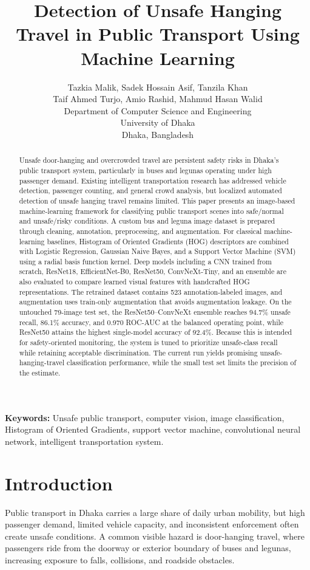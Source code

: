 \documentclass{article}
\title{Detection of Unsafe Hanging Travel in Public Transport Using Machine Learning}
\author{Tazkia Malik, Sadek Hossain Asif, Tanzila Khan\\
Taif Ahmed Turjo, Amio Rashid, Mahmud Hasan Walid\\
Department of Computer Science and Engineering\\
University of Dhaka\\
Dhaka, Bangladesh}
\date{}
\begin{document}
\maketitle

\begin{abstract}
Unsafe door-hanging and overcrowded travel are persistent safety risks in Dhaka's public transport system, particularly in buses and legunas operating under high passenger demand. Existing intelligent transportation research has addressed vehicle detection, passenger counting, and general crowd analysis, but localized automated detection of unsafe hanging travel remains limited. This paper presents an image-based machine-learning framework for classifying public transport scenes into safe/normal and unsafe/risky conditions. A custom bus and leguna image dataset is prepared through cleaning, annotation, preprocessing, and augmentation. For classical machine-learning baselines, Histogram of Oriented Gradients (HOG) descriptors are combined with Logistic Regression, Gaussian Naive Bayes, and a Support Vector Machine (SVM) using a radial basis function kernel. Deep models including a CNN trained from scratch, ResNet18, EfficientNet-B0, ResNet50, ConvNeXt-Tiny, and an ensemble are also evaluated to compare learned visual features with handcrafted HOG representations. The retrained dataset contains 523 annotation-labeled images, and augmentation uses train-only augmentation that avoids augmentation leakage. On the untouched 79-image test set, the ResNet50--ConvNeXt ensemble reaches 94.7\% unsafe recall, 86.1\% accuracy, and 0.970 ROC-AUC at the balanced operating point, while ResNet50 attains the highest single-model accuracy of 92.4\%. Because this is intended for safety-oriented monitoring, the system is tuned to prioritize unsafe-class recall while retaining acceptable discrimination. The current run yields promising unsafe-hanging-travel classification performance, while the small test set limits the precision of the estimate.
\end{abstract}

\noindent\textbf{Keywords:}
Unsafe public transport, computer vision, image classification, Histogram of Oriented Gradients, support vector machine, convolutional neural network, intelligent transportation system.

\section{Introduction}
Public transport in Dhaka carries a large share of daily urban mobility, but high passenger demand, limited vehicle capacity, and inconsistent enforcement often create unsafe conditions. A common visible hazard is door-hanging travel, where passengers ride from the doorway or exterior boundary of buses and legunas, increasing exposure to falls, collisions, and roadside obstacles.
\end{document}

